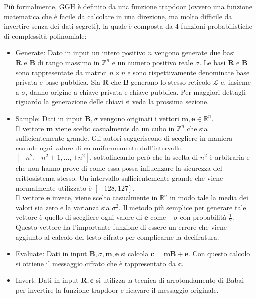 Più formalmente, GGH è definito da una funzione trapdoor (ovvero una funzione matematica che è facile da 
calcolare in una direzione, ma molto difficile da invertire senza dei dati segreti), la quale
è composta da 4 funzioni probabilistiche di complessità polinomiale:
\begin{itemize}
    \item Generate: Dato in input un intero positivo $n$ vengono generate due basi 
    $\mathbf{R} \text{ e } \mathbf{B}$ di rango massimo in
    $\mathbb{Z}^n$ e un numero positivo reale $\sigma$. Le basi $\mathbf{R} \text{ e } \mathbf{B}$
    sono rappresentate da matrici $n \times n$ e sono rispettivamente denominate base 
    privata e base pubblica. Sia $\mathbf{R}$ che $\mathbf{B}$ generano lo stesso reticolo 
    $\mathcal{L}$ e, insieme a $\sigma$, danno origine a chiave privata e chiave pubblica.
    Per maggiori dettagli riguardo la generazione delle chiavi si veda la prossima sezione.
    \item Sample: Dati in input $\mathbf{B}, \sigma$ vengono originati i vettori
    $\mathbf{m},\mathbf{e} \in \mathbb{R}^n$. \\
    Il vettore $\mathbf{m}$ viene scelto casualmente da un cubo in $\mathbb{Z}^n$ che sia 
    sufficientemente grande. Gli autori suggeriscono di scegliere in maniera casuale
    ogni valore di $\mathbf{m}$ uniformemente dall'intervallo $[-n^2, -n^2 + 1, \dots, +n^2]$, 
    sottolineando però che la scelta di $n^2$ è arbitraria e che non hanno prove
    di come essa possa influenzare la sicurezza del crittosistema stesso. Un intervallo
    sufficientemente grande che viene normalmente utilizzato è $[-128, 127]$. \\
    Il vettore $\mathbf{e}$ invece, viene scelto casualmente in  $\mathbb{R}^n$ in modo
    tale la media dei valori sia zero e la varianza sia $\sigma^2$. Il metodo più semplice
    per generare tale vettore è quello di scegliere ogni valore di $\mathbf{e}$ come $\pm\sigma$
    con probabilità $\frac{1}{2}$. Questo vettore ha l'importante funzione di essere un errore
    che viene aggiunto al calcolo del testo cifrato per complicarne la decifratura. 
    \item Evaluate: Dati in input $\mathbf{B}, \sigma, \mathbf{m}, \mathbf{e}$ si calcola
    $\mathbf{c} = \mathbf{m}\mathbf{B} + \mathbf{e}$. Con questo calcolo si ottiene
    il messaggio cifrato che è rappresentato da $\mathbf{c}$. 
    \item Invert: Dati in input $\mathbf{R},\mathbf{c}$ si utilizza la tecnica di arrotondamento
    di Babai per invertire la funzione trapdoor e ricavare il messaggio originale.
\end{itemize}

%
%

%
%
